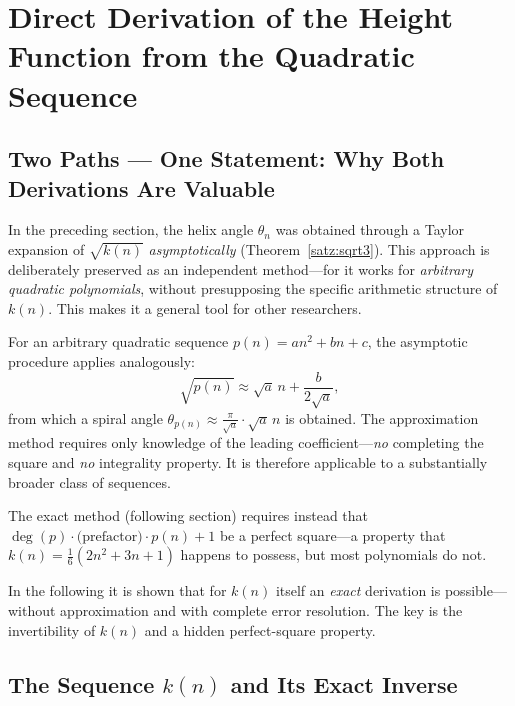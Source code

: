 \section{Direct Derivation of the Height Function from the Quadratic Sequence}
\label{sec:hoehenherleitung}

\subsection{Two Paths --- One Statement: Why Both Derivations Are Valuable}

In the preceding section, the helix angle $\theta_n$ was obtained
through a Taylor expansion of $\sqrt{k(n)}$ \emph{asymptotically}
(Theorem~\ref{satz:sqrt3}). This approach is deliberately preserved
as an independent method---for it works for \emph{arbitrary
quadratic polynomials}, without presupposing the specific arithmetic
structure of $k(n)$. This makes it a general tool for other researchers.

\begin{tcolorbox}[
  colback=green!4, colframe=green!40!black, enhanced,
  title={Methodological Note for Other Polynomials}]
For an arbitrary quadratic sequence $p(n) = an^2 + bn + c$, the
asymptotic procedure applies analogously:
\[
  \sqrt{p(n)} \approx \sqrt{a}\,n + \frac{b}{2\sqrt{a}},
\]
from which a spiral angle $\theta_{p(n)} \approx \tfrac{\pi}{\sqrt{a}}\cdot\sqrt{a}\,n$
is obtained. The approximation method requires only knowledge of the
leading coefficient---\emph{no} completing the square and \emph{no}
integrality property. It is therefore applicable to a substantially
broader class of sequences.

The exact method (following section) requires instead that
$\deg(p) \cdot \text{(prefactor)} \cdot p(n) + 1$ be a perfect
square---a property that $k(n) = \tfrac{1}{6}(2n^2+3n+1)$
happens to possess, but most polynomials do not.
\end{tcolorbox}

In the following it is shown that for $k(n)$ itself an \emph{exact}
derivation is possible---without approximation and with complete
error resolution. The key is the invertibility of $k(n)$
and a hidden perfect-square property.

\subsection{The Sequence \texorpdfstring{$k(n)$}{k(n)} and Its Exact Inverse}
\label{subsec:inverse}

